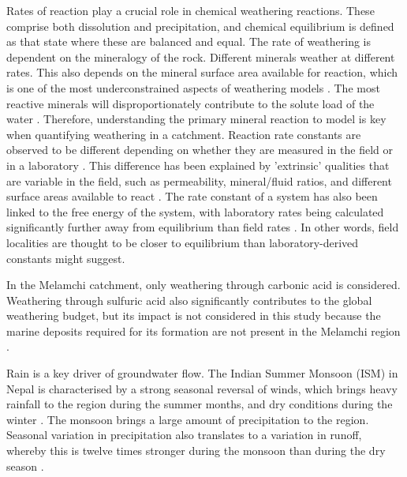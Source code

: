 Rates of reaction play a crucial role in chemical weathering reactions. These comprise both dissolution and precipitation, and chemical equilibrium is defined as that state where these are balanced and equal. The rate of weathering is dependent on the mineralogy of the rock. Different minerals weather at different rates. This also depends on the mineral surface area available for reaction, which is one of the most underconstrained aspects of weathering models \parencite{whiteEffectTimeWeathering2003}. The most reactive minerals will disproportionately contribute to the solute load of the water \parencite{shand1999}. Therefore, understanding the primary mineral reaction to model is key when quantifying weathering in a catchment. Reaction rate constants are observed to be different depending on whether they are measured in the field or in a laboratory \parencite{maherRoleReactionAffinity2009}. This difference has been explained by 'extrinsic' qualities that are variable in the field, such as permeability, mineral/fluid ratios, and different surface areas available to react \parencite{whiteEffectTimeWeathering2003}. The rate constant of a system has also been linked to the free energy of the system, with laboratory rates being calculated significantly further away from equilibrium than field rates \parencite{kampmanFeldsparDissolutionKinetics2009}. In other words, field localities are thought to be closer to equilibrium than laboratory-derived constants might suggest. 

\bsk

In the Melamchi catchment, only weathering through carbonic acid is considered. Weathering through sulfuric acid also significantly contributes to the global weathering budget, but its impact is not considered in this study because the marine deposits required for its formation are not present in the Melamchi region \parencite{bufeCovariationSilicateCarbonate2021}.

\bsk

Rain is a key driver of groundwater flow. The Indian Summer Monsoon (ISM) in Nepal is characterised by a strong seasonal reversal of winds, which brings heavy rainfall to the region during the summer months, and dry conditions during the winter \parencite{bookhagenCompleteHimalayanHydrological2010}. The monsoon brings a large amount of precipitation to the region. Seasonal variation in precipitation also translates to a variation in runoff, whereby this is twelve times stronger during the monsoon than during the dry season \parencite{sharma1997}. 

